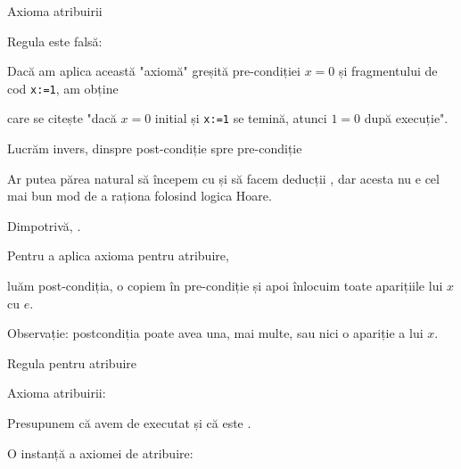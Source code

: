 \begin{frame}{Axioma atribuirii}

\begin{example}
Regula  este falsă: 

Dacă am aplica această "axiomă" greșită pre-condiției $x=0$ și fragmentului de cod \texttt{x:=1}, am obține
\begin{center}
\end{center}
care se citește "dacă $x=0$ initial și \texttt{x:=1} se temină, atunci $1=0$ după execuție".
\end{example}
\end{frame}

\begin{frame}{Lucrăm invers, dinspre post-condiție spre pre-condiție}

Ar putea părea natural să începem cu  și să facem deducții , dar acesta nu e cel mai bun mod de a raționa folosind logica Hoare.
	
	\medskip
Dimpotrivă, .

\pause
	\begin{example}
		Pentru a aplica axioma pentru atribuire,
		\begin{center}
		\end{center}
		luăm post-condiția, o copiem în pre-condiție și apoi înlocuim toate aparițiile lui $x$ cu $e$.
		
		Observație: postcondiția poate avea una, mai multe, sau nici o apariție a lui $x$.
	\end{example}

\end{frame}

\begin{frame}{Regula pentru atribuire}

\vspace{-.6cm}
\alert{Axioma atribuirii:} 

\medskip
\begin{example}
Presupunem că avem de executat  și că  este .

O instanță a axiomei de atribuire:
\pause
\vspace{-.2cm}
\begin{center}
\end{center}
\end{example}
\end{frame}

